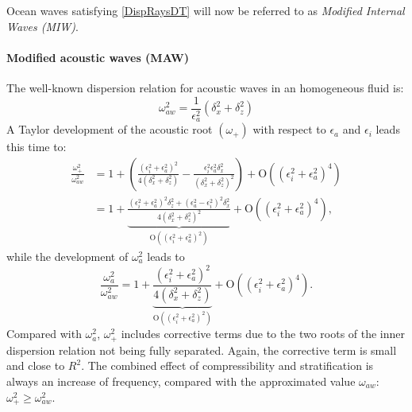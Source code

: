 \documentclass[a4paper,11pt]{article}
\begin{document}

Ocean waves satisfying \ref{DispRaysDT} will now be referred to as \textit{Modified Internal Waves (MIW)}.


\paragraph{Modified acoustic waves (MAW)}
The well-known dispersion relation for acoustic waves in an homogeneous fluid is:
%
\begin{equation}
\omega_{aw}^2 =\frac{1}{\epsilon_a^2}\left(\delta_x^2+\delta_z^2\right)
\label{DispAcous}
\end{equation}
%
A Taylor development of the acoustic root $(\omega_+)$ with respect to $\epsilon_a$ and $\epsilon_i$ leads this time to:
%
\begin{align}
\frac{\omega_+^2}{\omega_{aw}^2}&=1
+
\left(
\frac{(\epsilon_i^2+\epsilon_a^2)^2}{4(\delta_x^2+\delta_z^2)}
-\frac{\epsilon_i^2\epsilon_a^2 \delta_x^2}{(\delta_x^2+\delta_z^2)^2}
\right)
+\mathrm{O}((\epsilon_i^{2}+\epsilon_a^{2})^4)
\label{DispAcousDT}\\
&=1+\underbrace{\frac{(\epsilon_i^2+\epsilon_a^2)^2\delta_z^2+(\epsilon_a^2-\epsilon_i^2)^2\delta_x^2}{4(\delta_x^2+\delta_z^2)^2}}_{\mathrm{O}((\epsilon_i^{2}+\epsilon_a^{2})^2)}
+\mathrm{O}((\epsilon_i^{2}+\epsilon_a^{2})^4), \label{DispAcousDTfact}
\end{align}
%
while the development of $\omega_a^2$ leads to
\[
\frac{\omega_a^2}{\omega_{aw}^2}=1+
\underbrace{\frac{(\epsilon_i^2+\epsilon_a^2)^2}{4(\delta_x^2+\delta_z^2)}}_{\mathrm{O}((\epsilon_i^{2}+\epsilon_a^{2})^2)}
+\mathrm{O}((\epsilon_i^{2}+\epsilon_a^{2})^4).
\]
Compared with $\omega_a^2$, $\omega_+^2$ includes corrective terms due to the two roots of the inner dispersion relation not being fully separated. Again, the corrective term is small and close to $R^2$. The combined effect of compressibility and stratification is always an increase of frequency, compared with the approximated value $\omega_{aw}$: $\omega_+^2\ge \omega_{aw}^2$.\\
\end{document}
